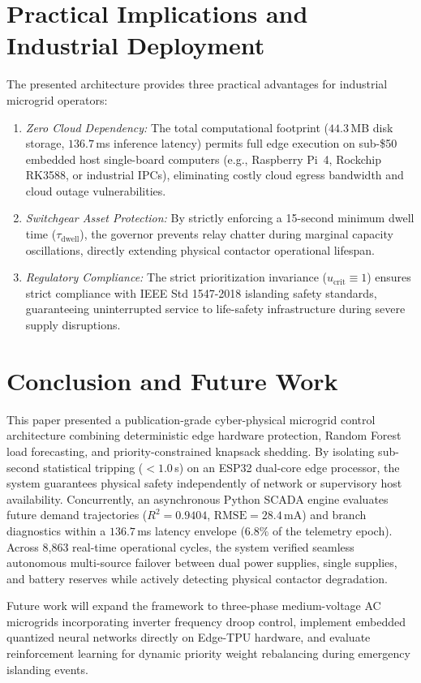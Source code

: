 \documentclass[journal,10pt,twocolumn]{IEEEtran}
\begin{document}
\section{Practical Implications and Industrial Deployment}
The presented architecture provides three practical advantages for industrial microgrid operators:
\begin{enumerate}
    \item \textit{Zero Cloud Dependency:} The total computational footprint ($44.3$\,MB disk storage, $136.7$\,ms inference latency) permits full edge execution on sub-\$50 embedded host single-board computers (e.g., Raspberry Pi~4, Rockchip RK3588, or industrial IPCs), eliminating costly cloud egress bandwidth and cloud outage vulnerabilities.
    \item \textit{Switchgear Asset Protection:} By strictly enforcing a 15-second minimum dwell time ($\tau_{\text{dwell}}$), the governor prevents relay chatter during marginal capacity oscillations, directly extending physical contactor operational lifespan.
    \item \textit{Regulatory Compliance:} The strict prioritization invariance ($u_{\text{crit}} \equiv 1$) ensures strict compliance with IEEE Std 1547-2018 islanding safety standards, guaranteeing uninterrupted service to life-safety infrastructure during severe supply disruptions.
\end{enumerate}

\section{Conclusion and Future Work}
This paper presented a publication-grade cyber-physical microgrid control architecture combining deterministic edge hardware protection, Random Forest load forecasting, and priority-constrained knapsack shedding. By isolating sub-second statistical tripping ($<1.0$\,s) on an ESP32 dual-core edge processor, the system guarantees physical safety independently of network or supervisory host availability. Concurrently, an asynchronous Python SCADA engine evaluates future demand trajectories ($R^2 = 0.9404$, $\text{RMSE} = 28.4$\,mA) and branch diagnostics within a $136.7$\,ms latency envelope ($6.8\%$ of the telemetry epoch). Across 8,863 real-time operational cycles, the system verified seamless autonomous multi-source failover between dual power supplies, single supplies, and battery reserves while actively detecting physical contactor degradation.

Future work will expand the framework to three-phase medium-voltage AC microgrids incorporating inverter frequency droop control, implement embedded quantized neural networks directly on Edge-TPU hardware, and evaluate reinforcement learning for dynamic priority weight rebalancing during emergency islanding events.



\end{document}
